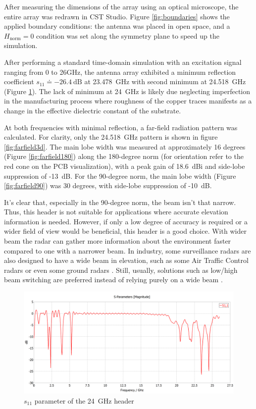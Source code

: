 After measuring the dimensions of the array using an optical microscope, the entire array was redrawn in CST Studio.
Figure \ref{fig:boundaries} shows the applied boundary conditions: the antenna was placed in open space, and a  $H_\mathrm{norm}=0$ condition was set along the symmetry plane to speed up the simulation.

After performing a standard time-domain simulation with an excitation signal ranging from 0 to 26GHz, the antenna array exhibited a minimum reflection coefficient $s_{11} \doteq -26.4 \mathrm{~dB}$ at 23.478~GHz with second minimum at 24.518~GHz (Figure \ref{fig:s11}).
The lack of minimum at 24~GHz is likely due neglecting imperfection in the manufacturing process where roughness of the copper traces manifests as a change in the effective dielectric constant of the substrate.

At both frequencies with minimal reflection, a far-field radiation pattern was calculated.
For clarity, only the 24.518~GHz pattern is shown in figure \ref{fig:farfield3d}.
The main lobe width was measured at approximately 16 degrees (Figure \ref{fig:farfield180}) along the 180-degree norm (for orientation refer to the red cone on the PCB visualization), with a peak gain of 18.6~dBi and side-lobe suppression of -13~dB.
For the 90-degree norm, the main lobe width (Figure \ref{fig:farfield90}) was 30 degrees, with side-lobe suppression of -10~dB.

It's clear that, especially in the 90-degree norm, the beam isn't that narrow.
Thus, this header is not suitable for applications where accurate elevation information is needed.
However, if only a low degree of accuracy is required or a wider field of view would be beneficial, this header is a good choice.
With wider beam  the radar can gather more information about the environment faster compared to one with a narrower beam.
In industry, some surveillance radars are also designed to have a wide beam in elevation, such as some Air Traffic Control radars \cite{kratos} or even some ground radars \cite{blighter}.
Still, usually, solutions such as low/high beam switching are preferred instead of relying purely on a wide beam \cite{wolfBeam}.

\begin{figure}[h!]
  \centering
  \includegraphics[width=\textwidth]{../img/s11.png}
  \caption[$s_{11}$ parameter of the 24~GHz header]{$s_{11}$ parameter of the 24~GHz header}
  \label{fig:s11}
\end{figure}


